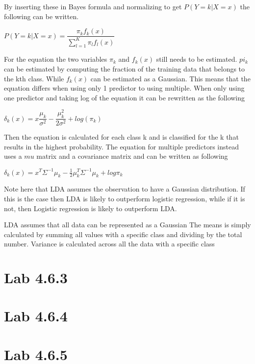 By inserting these in Bayes formula and normalizing to get $P(Y=k|X=x)$ the following can be written.

\begin{center}
	$P(Y=k|X = x) = \dfrac{\pi_k f_k(x)}{\sum_{l=1}^{K} \pi_l f_l(x)}$
\end{center}

For the equation the two variables $\pi_k$ and $f_k(x)$ still needs to be estimated. $pi_k$ can be estimated by computing the fraction of the training data that belongs to the kth class. While $f_k(x)$ can be estimated as a Gaussian. This means that the equation differs when using only 1 predictor to using multiple. When only using one predictor and taking log of the equation it can be rewritten as the following

\begin{center}
	$\delta_k(x) = x  \dfrac{\mu_k}{\sigma^2} - \dfrac{\mu_k^2}{2\sigma^2} + log(\pi_k)$
\end{center}

Then the equation is calculated for each class k and is classified for the k that results in the highest probability. The equation for multiple predictors instead uses a $mu$ matrix and a covariance matrix and can be written as following

\begin{center}
	$\delta_k(x) = x^T \Sigma^{-1} \mu_k -  \frac{1}{2} \mu_k^{T} \Sigma^{-1} \mu_k + log \pi_k$
\end{center}

Note here that LDA assumes the observation to have a Gaussian distribution. If this is the case then LDA is likely to outperform logistic regression, while if it is not, then Logistic regression is likely to outperform LDA.

LDA assumes that all data can be represented as a Gaussian 
The means is simply calculated by summing all values with a specific class and dividing by the total number.
Variance is calculated across all the data with a specific class 


\section{Lab 4.6.3}
\section{Lab 4.6.4}
\section{Lab 4.6.5}

